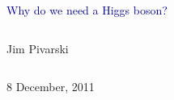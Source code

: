 \documentclass[compress]{beamer}
\begin{document}
\begin{frame}
\vfill
\begin{center}
\textcolor{darkblue}{\Large Why do we need a Higgs boson?}

\vfill
\begin{columns}
\begin{center}
\large
Jim Pivarski
\end{center}
\end{columns}


\vfill
 8 December, 2011

\end{center}
\end{frame}


\small
\end{document}
